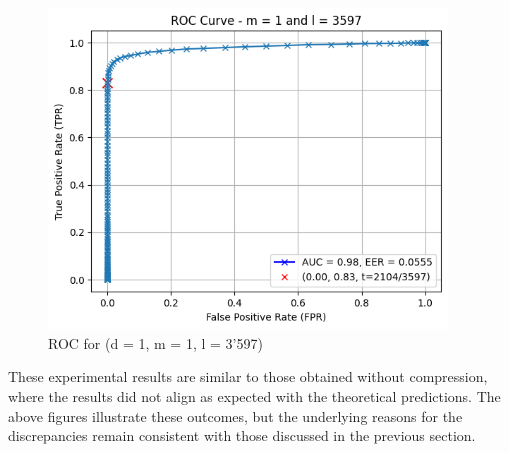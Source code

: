 \begin{enumerate}
\begin{itemize}
            \begin{figure}[H]
                \centering
                \includegraphics[width=\linewidth,height=8.5cm,keepaspectratio]{latex-img/FNR-FPR_ROC_config3_compression.png}
                \caption{ROC for (d = 1, m = 1, l = 3'597)}
                \label{FNR-FPR_ROC_TPR_config2}
            \end{figure}
        \end{itemize}
\end{enumerate}
\newpage
These experimental results are similar to those obtained without compression, where the results did not align as expected with the theoretical predictions. The above figures illustrate these outcomes, but the underlying reasons for the discrepancies remain consistent with those discussed in the previous section.
